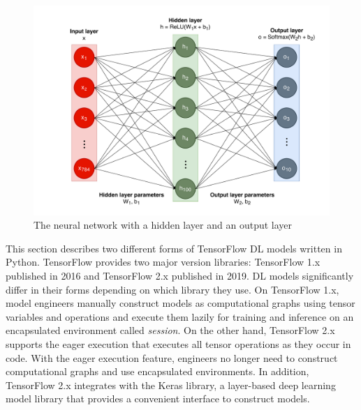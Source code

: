 \begin{figure}[ht!]\centering
\includegraphics[width=1\textwidth]{mnist_model.pdf}
  \caption{The neural network with a hidden layer and an output layer}
\label{fig:back:model}
\end{figure}

This section describes two different forms of TensorFlow DL models written in
Python.
TensorFlow provides two major version libraries: TensorFlow 1.x published in
2016 and TensorFlow 2.x published in 2019. 
DL models significantly differ in their forms depending on which library
they use. 
On TensorFlow 1.x, model engineers manually construct models as computational
graphs using tensor variables and operations and execute them lazily  for
training and inference on an encapsulated environment
called {\it session}.
On the other hand, TensorFlow 2.x supports the eager execution that executes
all tensor operations as they occur in code. 
With the eager execution feature, engineers no longer need to construct
computational graphs and use encapsulated environments.
In addition, TensorFlow 2.x integrates with the Keras library, a layer-based
deep learning model library that provides a convenient interface to construct
models.

